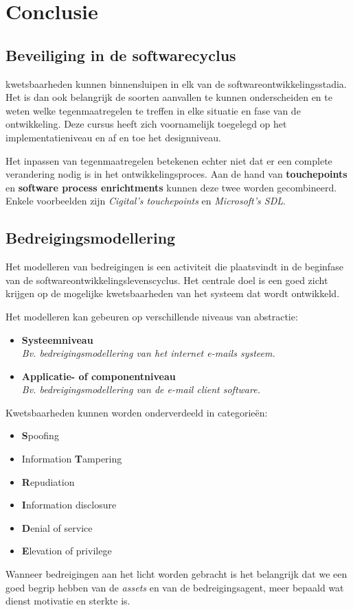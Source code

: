 \documentclass[../main.tex]{subfiles}
\begin{document}
\chapter{Conclusie}

\section{Beveiliging in de softwarecyclus}
kwetsbaarheden kunnen binnensluipen in elk van de softwareontwikkelingsstadia. Het is dan ook belangrijk de soorten aanvallen te kunnen onderscheiden en te weten welke tegenmaatregelen te treffen in elke situatie en fase van de ontwikkeling. Deze cursus heeft zich voornamelijk toegelegd op het implementatieniveau en af en toe het designniveau.

Het inpassen van tegenmaatregelen betekenen echter niet dat er een complete verandering nodig is in het ontwikkelingsproces. Aan de hand van \textbf{touchepoints} en \textbf{software process enrichtments} kunnen deze twee worden gecombineerd. Enkele voorbeelden zijn \textit{Cigital's touchepoints} en \textit{Microsoft's SDL}.

\section{Bedreigingsmodellering}
Het modelleren van bedreigingen is een activiteit die plaatsvindt in de beginfase van de softwareontwikkelingslevenscyclus. Het centrale doel is een goed zicht krijgen op de mogelijke kwetsbaarheden van het systeem dat wordt ontwikkeld. 

Het modelleren kan gebeuren op verschillende niveaus van abstractie:
\begin{itemize}
	\item \textbf{Systeemniveau} \\ \textit{Bv. bedreigingsmodellering van het internet e-mails systeem.}
	\item \textbf{Applicatie- of componentniveau} \\ \textit{Bv. bedreigingsmodellering van de e-mail client software.}
\end{itemize}
\noindent
Kwetsbaarheden kunnen worden onderverdeeld in categorie\"en:
\begin{itemize}
	\item \textbf{S}poofing
	\item Information \textbf{T}ampering
	\item \textbf{R}epudiation
	\item \textbf{I}nformation disclosure
	\item \textbf{D}enial of service
	\item \textbf{E}levation of privilege
\end{itemize}
Wanneer bedreigingen aan het licht worden gebracht is het belangrijk dat we een goed begrip hebben van de \textit{assets} en van de bedreigingsagent, meer bepaald wat dienst motivatie en sterkte is.
\end{document}
